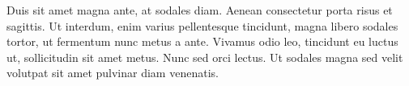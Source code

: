 \documentclass[11pt, a4paper]{awesome-cv}
\begin{document}
\begin{cvletter}
\begin{it}
Duis sit amet magna ante, at sodales diam. Aenean consectetur porta risus et sagittis. Ut interdum, enim varius pellentesque tincidunt, magna libero sodales tortor, ut fermentum nunc metus a ante. Vivamus odio leo, tincidunt eu luctus ut, sollicitudin sit amet metus. Nunc sed orci lectus. Ut sodales magna sed velit volutpat sit amet pulvinar diam venenatis.
\end{it}

\end{cvletter}


\makeletterclosing
\end{document}
